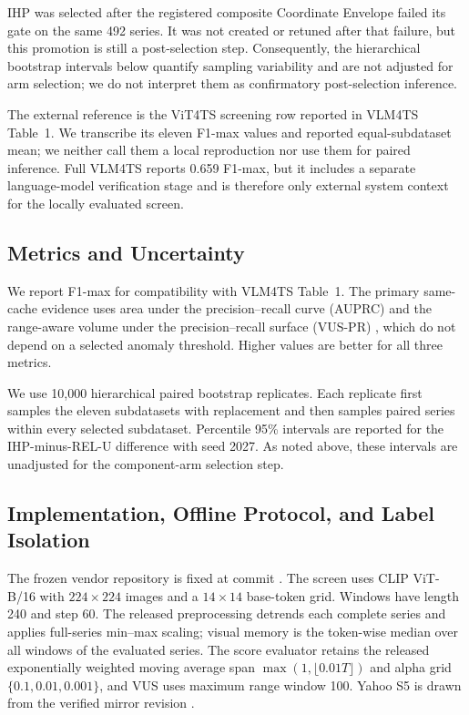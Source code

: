 IHP was selected after the registered composite Coordinate Envelope failed
its gate on the same 492 series. It was not created or retuned after that
failure, but this promotion is still a post-selection step. Consequently, the
hierarchical bootstrap intervals below quantify sampling variability and are
not adjusted for arm selection; we do not interpret them as confirmatory
post-selection inference.

The external reference is the ViT4TS screening row reported in VLM4TS
Table~1. We transcribe its eleven F1-max values and reported
equal-subdataset mean; we neither call them a local reproduction nor use them
for paired inference. Full VLM4TS reports 0.659 F1-max, but it includes a
separate language-model verification stage and is therefore only external
system context for the locally evaluated screen.

\subsection{Metrics and Uncertainty}

We report F1-max for compatibility with VLM4TS Table~1. The primary
same-cache evidence uses area under the precision--recall curve (AUPRC) and
the range-aware volume under the precision--recall surface (VUS-PR)
\cite{paparrizos2022vus}, which do not depend on a selected anomaly threshold.
Higher values are better for all three metrics.

We use 10,000 hierarchical paired bootstrap replicates. Each replicate first
samples the eleven subdatasets with replacement and then samples paired series
within every selected subdataset. Percentile 95\% intervals are reported for
the IHP-minus-\textsc{REL-U} difference with seed 2027. As noted above, these
intervals are unadjusted for the component-arm selection step.

\subsection{Implementation, Offline Protocol, and Label Isolation}

The frozen vendor repository is fixed at commit
. The screen uses CLIP
ViT-B/16 with $224\times224$ images and a $14\times14$ base-token grid.
Windows have length 240 and step 60. The released preprocessing detrends each
complete series and applies full-series min--max scaling; visual memory is the
token-wise median over all windows of the evaluated series. The score
evaluator retains the released exponentially weighted moving average span
$\max(1,\lfloor0.01T\rfloor)$ and alpha grid
$\{0.1,0.01,0.001\}$, and VUS uses maximum range window 100. Yahoo S5 is
drawn from the verified mirror revision
.

